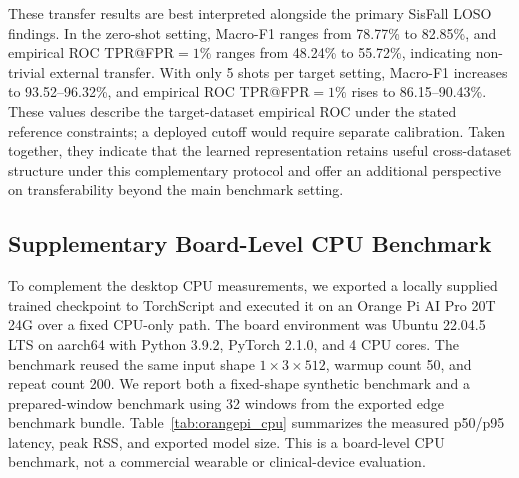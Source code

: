 \documentclass[jec]{acnsart}
\begin{document}
\begin{table}[htbp]
\caption{Supplementary cross-dataset transfer results under the separate 6-channel, length-200 protocol recorded in the experiment archive. Zero-shot transfer is non-trivial, and 5-shot adaptation substantially improves performance on all three external datasets.}
\label{tab:cross_dataset}
\centering
\small
{}
\end{table}

These transfer results are best interpreted alongside the primary SisFall LOSO findings. In the zero-shot setting, Macro-F1 ranges from 78.77\% to 82.85\%, and empirical ROC TPR@FPR${=}1\%$ ranges from 48.24\% to 55.72\%, indicating non-trivial external transfer. With only 5 shots per target setting, Macro-F1 increases to 93.52--96.32\%, and empirical ROC TPR@FPR${=}1\%$ rises to 86.15--90.43\%. These values describe the target-dataset empirical ROC under the stated reference constraints; a deployed cutoff would require separate calibration. Taken together, they indicate that the learned representation retains useful cross-dataset structure under this complementary protocol and offer an additional perspective on transferability beyond the main benchmark setting.

\subsection{Supplementary Board-Level CPU Benchmark}
\label{sec:hardware}

To complement the desktop CPU measurements, we exported a locally supplied trained checkpoint to TorchScript and executed it on an Orange Pi AI Pro 20T 24G over a fixed CPU-only path. The board environment was Ubuntu 22.04.5 LTS on aarch64 with Python 3.9.2, PyTorch 2.1.0, and 4 CPU cores. The benchmark reused the same input shape $1{\times}3{\times}512$, warmup count 50, and repeat count 200. We report both a fixed-shape synthetic benchmark and a prepared-window benchmark using 32 windows from the exported edge benchmark bundle. Table~\ref{tab:orangepi_cpu} summarizes the measured p50/p95 latency, peak RSS, and exported model size. This is a board-level CPU benchmark, not a commercial wearable or clinical-device evaluation.
\end{document}
